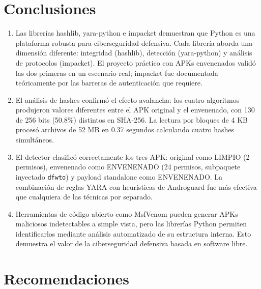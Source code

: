 \documentclass[12pt,a4paper]{article}
\begin{document}
\section{Conclusiones}

\begin{enumerate}
\item Las librerías hashlib, yara-python e impacket demuestran que Python
  es una plataforma robusta para ciberseguridad defensiva. Cada librería
  aborda una dimensión diferente: integridad (hashlib), detección
  (yara-python) y análisis de protocolos (impacket). El proyecto
  práctico con APKs envenenados validó las dos primeras en un escenario
  real; impacket fue documentada teóricamente por las barreras de
  autenticación que requiere.

\item El análisis de hashes confirmó el efecto avalancha: los cuatro
  algoritmos produjeron valores diferentes entre el APK original y el
  envenenado, con 130 de 256 bits (50.8\%) distintos en SHA-256. La
  lectura por bloques de 4 KB procesó archivos de 52 MB en 0.37 segundos
  calculando cuatro hashes simultáneos.

\item El detector clasificó correctamente los tres APK: original como
  LIMPIO (2 permisos), envenenado como ENVENENADO (24 permisos,
  subpaquete inyectado \texttt{dfwto}) y payload standalone como
  ENVENENADO. La combinación de reglas YARA con heurísticas de
  Androguard fue más efectiva que cualquiera de las técnicas por
  separado.

\item Herramientas de código abierto como MsfVenom pueden generar APKs
  maliciosos indetectables a simple vista, pero las librerías Python
  permiten identificarlos mediante análisis automatizado de su estructura
  interna. Esto demuestra el valor de la ciberseguridad defensiva basada
  en software libre.
\end{enumerate}

\section{Recomendaciones}
\end{document}
